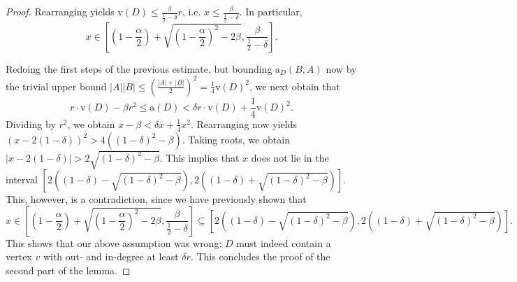 \documentclass[a4paper,10pt]{article}
\begin{document}
\begin{proof}
Rearranging yields $\mathrm{v}(D)\le \frac{\beta}{\frac{1}{2}-\delta}r$, i.e. $x\le \frac{\beta}{\frac{1}{2}-\delta}$. In particular, $$x\in \left[\left(1-\frac{\alpha}{2}\right)+\sqrt{\left(1-\frac{\alpha}{2}\right)^2-2\beta},\frac{\beta}{\frac{1}{2}-\delta}\right].$$

Redoing the first steps of the previous estimate, but bounding $\mathrm{a}_D(B,A)$ now by the trivial upper bound $|A||B|\le \left(\frac{|A|+|B|}{2}\right)^2=\frac{1}{4}\mathrm{v}(D)^2$, we next obtain that
$$r\cdot \mathrm{v}(D)-\beta r^2\le \mathrm{a}(D)< \delta r\cdot \mathrm{v}(D)+\frac{1}{4}\mathrm{v}(D)^2.$$
Dividing by $r^2$, we obtain $x-\beta< \delta x+\frac{1}{4}x^2$. Rearranging now yields $(x-2(1-\delta))^2>4((1-\delta)^2-\beta)$. Taking roots, we obtain $|x-2(1-\delta)|>2\sqrt{(1-\delta)^2-\beta}$. This implies that $x$ does not lie in the interval $[2((1-\delta)-\sqrt{(1-\delta)^2-\beta}),2((1-\delta)+\sqrt{(1-\delta)^2-\beta})]$. This, however, is a contradiction, since we have previously shown that $$x\in \left[\left(1-\frac{\alpha}{2}\right)+\sqrt{\left(1-\frac{\alpha}{2}\right)^2-2\beta},\frac{\beta}{\frac{1}{2}-\delta}\right]\subseteq [2((1-\delta)-\sqrt{(1-\delta)^2-\beta}),2((1-\delta)+\sqrt{(1-\delta)^2-\beta})].$$ This shows that our above assumption was wrong: $D$ must indeed contain a vertex $v$ with out- and in-degree at least $\delta r$. This concludes the proof of the second part of the lemma. 
\end{proof}
\end{document}

